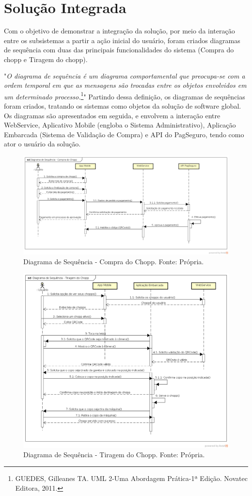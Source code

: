 \section{Solução Integrada}

Com o objetivo de demonstrar a integração da solução, por meio da interação entre os subsistemas a partir a ação inicial 
do usuário, foram criados diagramas de sequência com duas das principais funcionalidades do sistema (Compra do chopp e 
Tiragem do chopp).


"\textit{O diagrama de sequência é um diagrama comportamental que preocupa-se com a ordem temporal em que as mensagens 
são trocadas entre os objetos envolvidos em um determinado processo.}\footnote{GUEDES, Gilleanes TA. UML 2-Uma Abordagem 
Prática-1ª Edição. Novatec Editora, 2011.}" Partindo dessa definição, os diagramas de sequências 
foram criados, tratando os sistemas como objetos da solução de software global. Os diagramas são apresentados em seguida, 
e envolvem a interação entre WebService, Aplicativo Mobile (engloba o Sistema Administrativo), Aplicação Embarcada (Sistema de 
Validação de Compra) e API do PagSeguro, tendo como ator o usuário da solução.


\begin{figure}[!htb]
    \centering
    \includegraphics[scale= 0.4]{figuras/Diagrama-de-Sequencia-Compra-do-Chopp.png}        
    \caption{Diagrama de Sequência - Compra do Chopp. Fonte: Própria.}
    \label{classes-kivy}
\end{figure}

\begin{figure}[!htb]
    \centering
    \includegraphics[scale= 0.4]{figuras/Diagrama-de-Sequencia-Tiragem-do-Chopp.png}        
    \caption{Diagrama de Sequência - Tiragem do Chopp. Fonte: Própria.}
    \label{classes-kivy}
\end{figure}

